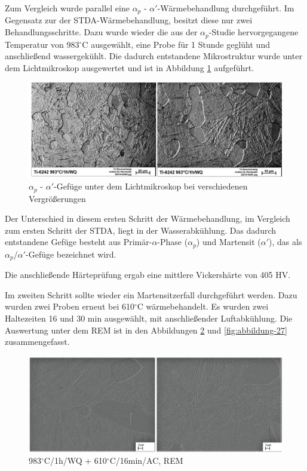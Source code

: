 Zum Vergleich wurde parallel eine $\alpha_p$ - $\alpha'$-Wärmebehandlung durchgeführt. Im Gegensatz zur der STDA-Wärmebehandlung, besitzt diese nur zwei Behandlungsschritte.
Dazu wurde wieder die aus der $\alpha_p$-Studie hervorgegangene Temperatur von 983$^\circ$C ausgewählt, eine Probe für 1 Stunde geglüht und anschließend wassergekühlt. Die dadurch entstandene Mikrostruktur wurde unter dem Lichtmikroskop ausgewertet und ist in Abbildung \ref{fig:abbildung-19} aufgeführt.

\begin{figure}[h]
	\centering
	\includegraphics[width=1.0\linewidth]{./Bilder/Abbildung 19.png}
	\caption[Abbildung 19]{$\alpha_p$ - $\alpha'$-Gefüge unter dem Lichtmikroskop bei verschiedenen Vergrößerungen}
	\label{fig:abbildung-19}
\end{figure}

Der Unterschied in diesem ersten Schritt der Wärmebehandlung, im Vergleich zum ersten Schritt der STDA, liegt in der Wasserabkühlung. Das dadurch entstandene Gefüge besteht aus Primär-$\alpha$-Phase ($\alpha_p$) und Martensit ($\alpha'$), das als $\alpha_p$/$\alpha'$-Gefüge bezeichnet wird.

Die anschließende Härteprüfung ergab eine mittlere Vickershärte von 405 HV.

Im zweiten Schritt sollte wieder ein Martensitzerfall durchgeführt werden. Dazu wurden zwei Proben erneut bei 610$^\circ$C wärmebehandelt. Es wurden zwei Haltezeiten 16 und 30 min ausgewählt, mit anschließender Luftabkühlung. Die Auswertung unter dem REM ist in den Abbildungen \ref{fig:abbildung-26} und \ref{fig:abbildung-27} zusammengefasst.

\begin{figure}
	\centering
	\includegraphics[width=1.0\linewidth]{./Bilder/Abbildung 26.png}
	\caption[Abbildung 26]{983$^\circ$C/1h/WQ + 610$^\circ$C/16min/AC, REM}
	\label{fig:abbildung-26}
\end{figure}

